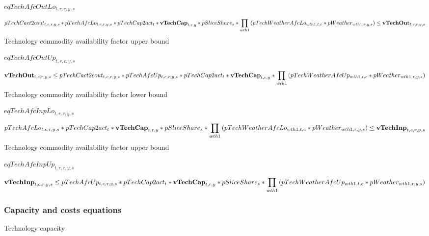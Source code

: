 \documentclass{article}
\begin{document}
$eqTechAfcOutLo_{t,r,c,y,s}$





\begin{dmath}
pTechCact2cout_{t,c,r,y,s}*pTechAfcLo_{t,c,r,y,s}*pTechCap2act_{t}*{\bf vTechCap}_{t,r,y}*pSliceShare_{s}*\prod_{wth1}{\left(pTechWeatherAfcLo_{wth1,t,c}*pWeather_{wth1,r,y,s}\right)}  \le  {\bf vTechOut}_{t,c,r,y,s}
\end{dmath}
Technology commodity availability factor upper bound







$eqTechAfcOutUp_{t,r,c,y,s}$





\begin{dmath}
{\bf vTechOut}_{t,c,r,y,s}  \le  pTechCact2cout_{t,c,r,y,s}*pTechAfcUp_{t,c,r,y,s}*pTechCap2act_{t}*{\bf vTechCap}_{t,r,y}*\prod_{wth1}{\left(pTechWeatherAfcUp_{wth1,t,c}*pWeather_{wth1,r,y,s}\right)}
\end{dmath}
Technology commodity availability factor lower bound







$eqTechAfcInpLo_{t,r,c,y,s}$





\begin{dmath}
pTechAfcLo_{t,c,r,y,s}*pTechCap2act_{t}*{\bf vTechCap}_{t,r,y}*pSliceShare_{s}*\prod_{wth1}{\left(pTechWeatherAfcLo_{wth1,t,c}*pWeather_{wth1,r,y,s}\right)}  \le  {\bf vTechInp}_{t,c,r,y,s}
\end{dmath}
Technology commodity availability factor upper bound







$eqTechAfcInpUp_{t,r,c,y,s}$





\begin{dmath}
{\bf vTechInp}_{t,c,r,y,s}  \le  pTechAfcUp_{t,c,r,y,s}*pTechCap2act_{t}*{\bf vTechCap}_{t,r,y}*pSliceShare_{s}*\prod_{wth1}{\left(pTechWeatherAfcUp_{wth1,t,c}*pWeather_{wth1,r,y,s}\right)}
\end{dmath}
\subsubsection*{Capacity and costs equations}
Technology capacity
\end{document}
